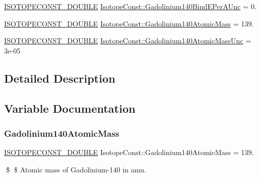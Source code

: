 \begin{DoxyCompactItemize}
\item 
\mbox{\hyperlink{group___isotope_const-_macros_ga8f45a7272ce02c0b4c65c44636ed719a}{I\+S\+O\+T\+O\+P\+E\+C\+O\+N\+S\+T\+\_\+\+D\+O\+U\+B\+LE}} \mbox{\hyperlink{group___isotope_const-_gadolinium-_gd140_gaa08b626885f4e329e7d1098012d454da}{Isotope\+Const\+::\+Gadolinium140\+Bind\+E\+Per\+A\+Unc}} = 0.
\item 
\mbox{\hyperlink{group___isotope_const-_macros_ga8f45a7272ce02c0b4c65c44636ed719a}{I\+S\+O\+T\+O\+P\+E\+C\+O\+N\+S\+T\+\_\+\+D\+O\+U\+B\+LE}} \mbox{\hyperlink{group___isotope_const-_gadolinium-_gd140_ga9020b4d5b496b95afb9e83f200284cc7}{Isotope\+Const\+::\+Gadolinium140\+Atomic\+Mass}} = 139.
\item 
\mbox{\hyperlink{group___isotope_const-_macros_ga8f45a7272ce02c0b4c65c44636ed719a}{I\+S\+O\+T\+O\+P\+E\+C\+O\+N\+S\+T\+\_\+\+D\+O\+U\+B\+LE}} \mbox{\hyperlink{group___isotope_const-_gadolinium-_gd140_gaf5d94f85f67ae9c64414b7b2c7bb1810}{Isotope\+Const\+::\+Gadolinium140\+Atomic\+Mass\+Unc}} = 3e-\/05
\end{DoxyCompactItemize}


\subsection{Detailed Description}


\subsection{Variable Documentation}
\mbox{\label{group___isotope_const-_gadolinium-_gd140_ga9020b4d5b496b95afb9e83f200284cc7}} 
\subsubsection{\texorpdfstring{Gadolinium140\+Atomic\+Mass}{Gadolinium140AtomicMass}}
{\footnotesize\ttfamily \mbox{\hyperlink{group___isotope_const-_macros_ga8f45a7272ce02c0b4c65c44636ed719a}{I\+S\+O\+T\+O\+P\+E\+C\+O\+N\+S\+T\+\_\+\+D\+O\+U\+B\+LE}} Isotope\+Const\+::\+Gadolinium140\+Atomic\+Mass = 139.}

\$ \$ Atomic mass of Gadolinium-\/140 in amu. \mbox{\label{group___isotope_const-_gadolinium-_gd140_gaf5d94f85f67ae9c64414b7b2c7bb1810}} 
